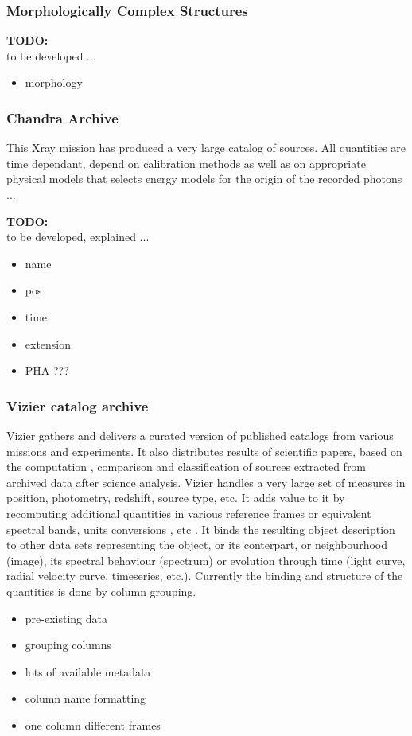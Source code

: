 \documentclass[11pt,a4paper]{ivoa}
\newcommand{\TODO}[1]{%
    \noindent%
    \colorbox{todocolor}{%
            \parbox{0.85\linewidth}{\sffamily \textbf{TODO:}\\
            #1}
    }%
    \vspace{2pt}

}
\begin{document}
\subsubsection{Morphologically Complex Structures}

\TODO{to be developed ...}
\begin{itemize}
    \item morphology
\end{itemize}

\subsubsection{Chandra Archive}
This Xray mission has produced a very large catalog of sources. %
All quantities are time dependant, depend on calibration methods as well as on appropriate physical
models that selects energy models for the origin of the recorded photons ...
\TODO{to be developed, explained ...}
\begin{itemize}
    \item name
    \item pos
    \item time
    \item extension
    \item PHA ???
\end{itemize}

\subsubsection{Vizier catalog archive  }
Vizier gathers and delivers a curated version of published catalogs from various missions and experiments.
It also distributes results of scientific papers, based on the computation , comparison and classification of sources extracted from archived data after science analysis.
Vizier handles a very large set of measures in position, photometry, redshift, source type, etc.
It adds value to it by recomputing additional quantities in various reference frames or equivalent spectral bands, units conversions , etc .
It binds the resulting object description to other data sets representing the object, or its conterpart, or neighbourhood (image), its spectral behaviour (spectrum) or evolution through time (light curve, radial velocity curve, timeseries, etc.).
Currently the binding and structure of the quantities is done by column grouping.
\begin{itemize}
    \item pre-existing data
    \item grouping columns
    \item lots of available metadata
    \item column name formatting
    \item one column different frames
\end{itemize}
\end{document}
